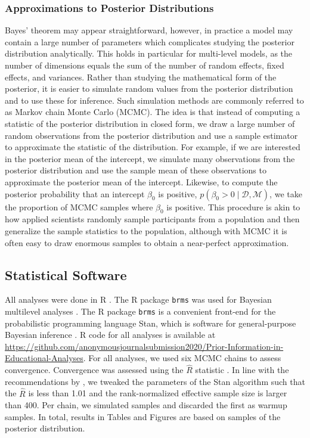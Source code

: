 \documentclass[man, floatsintext]{apa7}
\newcommand{\getValInt}[3]{%
	\pgfplotstablegetelem{#1}{#2}\of{#3}%
	\pgfmathprintnumber[fixed, fixed zerofill=false]{\pgfplotsretval}%
}
\newcommand{\code}[1]{\texttt{#1}}
\newcommand{\prob}[1]{p\left(#1\right)}
\newcommand{\data}{\mathcal{D}}
\newcommand{\model}{\mathcal{M}}
\newcommand{\githubLink}{\url{https://github.com/anonymousjournalsubmission2020/Prior-Information-in-Educational-Analyses}}
\begin{document}
\subsubsection{Approximations to Posterior Distributions}
Bayes' theorem may appear straightforward, however, in practice a model may contain a large number of parameters which complicates studying the posterior distribution analytically. 
This holds in particular for multi-level models, as the number of dimensions equals the sum of the number of random effects, fixed effects, and variances.
Rather than studying the mathematical form of the posterior, it is easier to simulate random values from the posterior distribution and to use these for inference.
Such simulation methods are commonly referred to as Markov chain Monte Carlo (MCMC).
The idea is that instead of computing a statistic of the posterior distribution in closed form, we draw a large number of random observations from the posterior distribution and use a sample estimator to approximate the statistic of the distribution.
For example, if we are interested in the posterior mean of the intercept, we simulate many observations from the posterior distribution and use the sample mean of these observations to approximate the posterior mean of the intercept.
Likewise, to compute the posterior probability that an intercept $\beta_0$ is positive, $\prob{\beta_0 > 0 \mid \data , \model}$, we take the proportion of MCMC samples where $\beta_0$ is positive.
This procedure is akin to how applied scientists randomly sample participants from a population and then generalize the sample statistics to the population, although with MCMC it is often easy to draw enormous samples to obtain a near-perfect approximation.

\subsection{Statistical Software}

All analyses were done in R \parencite{R}.
The R package \code{brms} was used for Bayesian multilevel analyses \parencite{burkner2017brms}.
The R package \code{brms} is a convenient front-end for the probabilistic programming language Stan, which is software for general-purpose Bayesian inference \parencite{carpenter2017stan}.
R code for all analyses is available at \githubLink{}.
For all analyses, we used six MCMC chains to assess convergence.
Convergence was assessed using the $\widehat{R}$ statistic \parencite{vehtari2019rank}.
In line with the recommendations by \textcite{vehtari2019rank}, we tweaked the parameters of the Stan algorithm such that the $\widehat{R}$ is less than 1.01 and the rank-normalized effective sample size is larger than 400.
Per chain, we simulated \getValInt{0}{iter}{\tbMCMCsettings} samples and discarded the first \getValInt{0}{warmup}{\tbMCMCsettings} as warmup samples.
In total, results in Tables and Figures are based on \getValInt{0}{total}{\tbMCMCsettings} samples of the posterior distribution.
\end{document}
